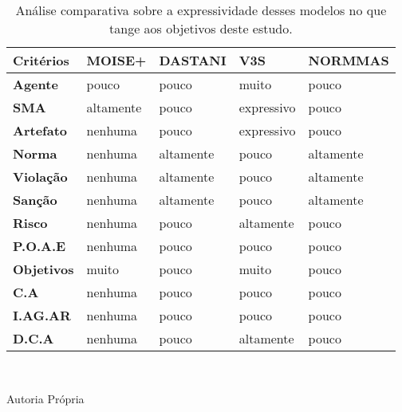 \begin{table}[H]
    \centering
    \caption{Análise comparativa sobre a expressividade desses modelos no que tange aos objetivos deste estudo.}
    \begin{tabular}{|l|l|l|l|l|}
        \hline
        \textbf{Critérios} & \textbf{MOISE+}        & \textbf{DASTANI}     & \textbf{V3S}         & \textbf{NORMMAS}          \\ \hline
        \textbf{Agente}    & pouco                  & pouco                & muito                & pouco                     \\ \hline
        \textbf{SMA}       & altamente              & pouco                & expressivo           & pouco                     \\ \hline
        \textbf{Artefato}  & nenhuma                & pouco                & expressivo           & pouco                     \\ \hline
        \textbf{Norma}     & nenhuma                & altamente            & pouco                & altamente                 \\ \hline
        \textbf{Violação}  & nenhuma                & altamente            & pouco                & altamente                 \\ \hline
        \textbf{Sanção}    & nenhuma                & altamente            & pouco                & altamente                 \\ \hline
        \textbf{Risco}     & nenhuma                & pouco                & altamente            & pouco                     \\ \hline
        \textbf{P.O.A.E}   & nenhuma                & pouco                & pouco                & pouco                     \\ \hline
        \textbf{Objetivos} & muito                  & pouco                & muito                & pouco                     \\ \hline
        \textbf{C.A}       & nenhuma                & pouco                & pouco                & pouco                     \\ \hline
        \textbf{I.AG.AR}   & nenhuma                & pouco                & pouco                & pouco                    \\ \hline
        \textbf{D.C.A}     & nenhuma                & pouco                & altamente            & pouco 
    \\ \hline
    \end{tabular}
    \label{comparemodel}
    \\
    \begin{center}
        Autoria Própria
    \end{center}
\end{table}

